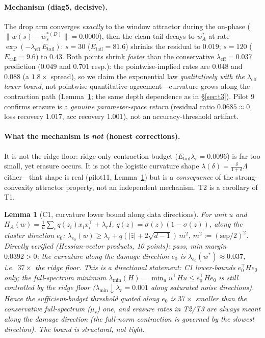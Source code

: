 \documentclass{article}
\newtheorem{lemma}{Lemma}
\newcommand{\lam}{\lambda}
\newcommand{\lameff}{\lam_{\mathrm{eff}}}
\begin{document}
\paragraph{Mechanism (diag5, decisive).} The drop arm converges \emph{exactly} to the window
attractor during the on-phase ($\|w(s)-w^{*(D)}_s\|=0.0000$), then the clean tail decays to
$w^*_A$ at rate $\exp(-\lameff\,E_{\mathrm{tail}})$: $s=30$ ($E_{\mathrm{tail}}=81.6$) shrinks the
residual to $0.019$; $s=120$ ($E_{\mathrm{tail}}=9.6$) to $0.43$. Both points shrink
\emph{faster} than the conservative $\lameff=0.037$ prediction ($0.049$ and $0.701$ resp.):
the pointwise-implied rates are $0.048$ and $0.088$ (a $1.8\times$ spread), so we claim the
exponential law \emph{qualitatively with the $\lameff$ lower bound}, not pointwise quantitative
agreement---curvature grows along the contraction path
(Lemma~\ref{lem:c1}; the same depth dependence as in \S\ref{sec:t3}). Pilot 9 confirms erasure
is a \emph{genuine parameter-space return} (residual ratio $0.0685\approx0$, loss recovery $1.017$,
acc recovery $1.001$), not an accuracy-threshold artifact.

\paragraph{What the mechanism is \emph{not} (honest corrections).} It is not the ridge floor:
ridge-only contraction budget ($E_{\mathrm{tail}}\lambda_r=0.0096$) is far too small, yet erasure
occurs. It is not the logistic curvature shape $\lambda(\delta)=\frac{\delta}{1+\delta}\Lambda$
either---that shape is real (pilot11, Lemma~\ref{lem:c1}) but is a \emph{consequence} of the
strong-convexity attractor property, not an independent mechanism. T2 is a corollary of T1.

\begin{lemma}[C1, curvature lower bound along data directions]
\label{lem:c1}
For unit $u$ and $H_A(w)=\frac1n\sum_i q(z_i)x_ix_i^\top+\lambda_r I$, $q(z)=\sigma(z)(1-\sigma(z))$,
along the cluster direction $e_0$: $\lambda_{e_0}(w)\ge\lambda_r+q(|\bar z|+2\sqrt{d-1})\,m^2$,
$m^2:=(\mathrm{sep}/2)^2$. Directly verified (Hessian-vector products, 10 points): pass,
min margin $0.0392>0$; the curvature \emph{along the damage direction} $e_0$ is
$\lambda_{e_0}(w^*)\approx0.037$, i.e.\ $37\times$ the ridge floor. This is a directional
statement: C1 lower-bounds $e_0^\top H e_0$ only; the full-spectrum minimum
$\lambda_{\min}(H)=\min_u u^\top Hu\le e_0^\top H e_0$ is still controlled by the ridge floor
($\lambda_{\min}\downarrow\lambda_r=0.001$ along saturated noise directions). Hence the
sufficient-budget threshold quoted along $e_0$ is $37\times$ smaller than the conservative
full-spectrum ($\mu_r$) one, and erasure rates in T2/T3 are always meant along the damage
direction (the full-norm contraction is governed by the slowest direction). The bound is
structural, not tight.
\end{lemma}
\end{document}
